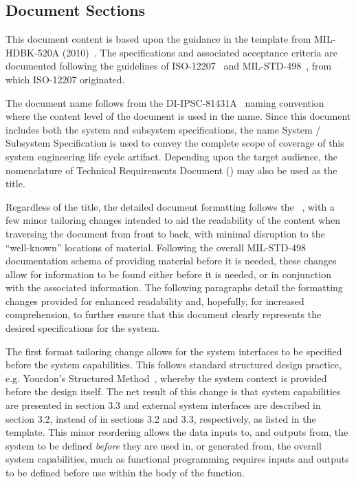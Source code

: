 
\subsection{Document Sections}
\label{ssec:Intro_DocSections}

This document content is based upon the guidance in the \TRD template from MIL-HDBK-520A (2010)~\cite{ref__MIL_HDBK_520}.
The specifications and associated acceptance criteria are documented following the guidelines of ISO-12207~\cite{ref__ISO_12207} and MIL-STD-498~\cite{ref__MIL_STD_498}, from which ISO-12207 originated.

The document name follows from the \DID DI-IPSC-81431A~\cite{ref__SSS_DID} naming convention where the content level of the document is used in the name.
Since this document includes both the system and subsystem specifications, the name System / Subsystem Specification is used to convey the complete scope of coverage of this system engineering life cycle artifact.
Depending upon the target audience, the nomenclature of Technical Requirements Document (\TRD) may also be used as the title. 

Regardless of the title, the detailed document formatting follows the \SSS \DID~\cite{ref__SSS_DID}, with a few minor tailoring changes intended to aid the readability of the content when traversing the document from front to back, with minimal disruption to the ``well-known'' locations of material.
Following the overall MIL-STD-498~\cite{ref__MIL_STD_498} documentation schema of providing material before it is needed, these changes allow for information to be found either before it is needed, or in conjunction with the associated information.
The following paragraphs detail the formatting changes provided for enhanced readability and, hopefully, for increased comprehension, to further ensure that this document clearly represents the desired specifications for the system.

The first format tailoring change allows for the system interfaces to be specified before the system capabilities. 
This follows standard structured design practice, e.g. Yourdon's Structured Method~\cite{ref__JESA}, whereby the system context is provided before the design itself.
The net result of this change is that system capabilities are presented in section 3.3 and external system interfaces are described in section 3.2, instead of in sections 3.2 and 3.3, respectively, as listed in the \SSS template.
This minor reordering allows the data inputs to, and outputs from, the system to be defined {\em before} they are used in, or generated from, the overall system capabilities, much as functional programming requires inputs and outputs to be defined before use within the body of the function.

